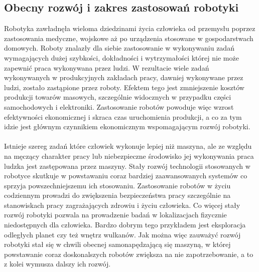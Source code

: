 \subsection{Obecny rozwój i zakres zastosowań robotyki}
Robotyka zawładnęła wieloma dziedzinami życia człowieka od przemysłu poprzez
zastosowania medyczne, wojskowe aż po urządzenia stosowane w gospodarstwach
domowych. Roboty znalazły dla siebie zastosowanie w wykonywaniu zadań
wymagających dużej szybkości, dokładności i wytrzymałości której nie może
zapewnić praca wykonywana przez ludzi. W rezultacie wiele zadań wykonywanych w
produkcyjnych zakładach pracy, dawniej wykonywane przez ludzi, zostało zastąpione
przez roboty. Efektem tego jest zmniejszenie kosztów produkcji towarów masowych,
szczególnie widocznych w przypadku części samochodowych i elektroniki.
Zastosowanie robotów powoduje więc wzrost efektywności ekonomicznej i skraca czas
uruchomienia produkcji, a co za tym idzie jest głównym czynnikiem ekonomicznym wspomagającym rozwój robotyki. \\
\\
Istnieje szereg zadań które człowiek wykonuje lepiej niż maszyna, ale ze względu
na męczący charakter pracy lub niebezpieczne środowisko jej wykonywania praca
ludzka jest zastępowana przez maszyny. Stały rozwój technologii stosowanych w
robotyce skutkuje w powstawaniu coraz bardziej zaawansowanych systemów co sprzyja
powszechniejszemu ich stosowaniu. Zastosowanie robotów w życiu codziennym
prowadzi do zwiększenia bezpieczeństwa pracy szczególnie na stanowiskach pracy
zagrażających zdrowiu i życiu człowieka. Co więcej stały rozwój robotyki pozwala
na prowadzenie badań w lokalizacjach fizycznie niedostępnych dla człowieka.
Bardzo dobrym tego przykładem jest eksploracja odległych planet czy też wnętrz
wulkanów. Jak można więc zauważyć rozwój robotyki stał się w chwili obecnej
samonapędzającą się maszyną, w której powstawanie coraz doskonalszych robotów
zwiększa na nie zapotrzebowanie, a to z kolei wymusza dalszy ich rozwój.
